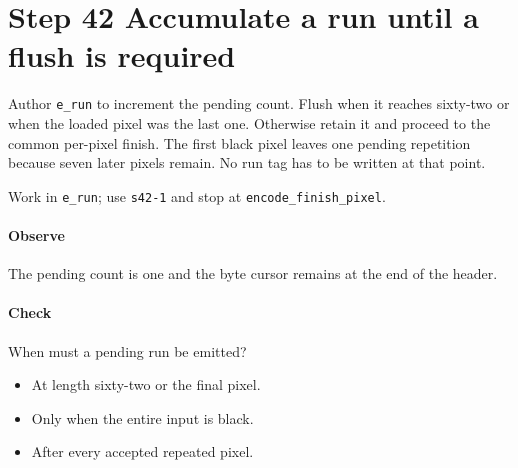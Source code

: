 \section{Step 42 Accumulate a run until a flush is required}\label{qoi-s42}
Author \texttt{e\_run} to increment the pending count. Flush when it reaches sixty-two or when the loaded pixel was the last one. Otherwise retain it and proceed to the common per-pixel finish. The first black pixel leaves one pending repetition because seven later pixels remain. No run tag has to be written at that point.

Work in \texttt{e\_run}; use \texttt{s42-1} and stop at \texttt{encode\_finish\_pixel}.

\paragraph{Observe} The pending count is one and the byte cursor remains at the end of the header.

\paragraph{Check} When must a pending run be emitted?
\begin{itemize}
  \item[A.] At length sixty-two or the final pixel.
  \item[B.] Only when the entire input is black.
  \item[C.] After every accepted repeated pixel.
\end{itemize}
